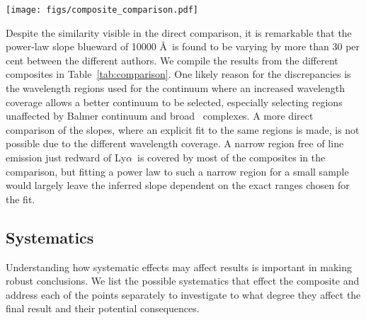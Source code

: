 \documentclass{aa}    %
\newcommand{\figlabel}[1]{\label{fig:#1}}
\newcommand{\Tab}[1]{Table~\ref{tab:#1}}
\newcommand{\tab}[1]{\Tab{#1}}
\newcommand{\sectlabel}[1]{\label{sect:#1}}
\newcommand{\lya}{Ly$\alpha$}
\newcommand{\feii}{\ion{Fe}{ii}}
\begin{document}
 \begin{figure*}[t!]
   \centering
   \texttt{[image: figs/composite\_comparison.pdf]}
   \caption[]{Comparison of different composites. The composites by
     \citet{Lusso2015, VandenBerk2001, Telfer2002, Francis1991} are
     normalized to the X-shooter composite at $\sim 1450$ \AA~and the
     composite by \citet{Glikman2006} is normalized to ours at $\sim
     3850$ \AA. Significant differences are visible blueward of
     \lya~due to differing IGM correction methods. Above 5000 \AA~
     significant host galaxy contamination is visible in the composite
     by \citet{VandenBerk2001}. Overplot in blue is a power law
     with slope $\alpha_\lambda = -1.70$ and normalized at $\sim 1450$ \AA.}
   \figlabel{composite_comparison}
 \end{figure*}
  
 
Despite the similarity visible in the direct comparison, it is
remarkable that the power-law slope blueward of 10000 \AA~is found to
be varying by more than 30 per cent between the different authors. We
compile the results from the different composites in
\tab{comparison}. One likely reason for the discrepancies is the
wavelength regions used for the continuum where an increased
wavelength coverage allows a better continuum to be selected,
especially selecting regions unaffected by Balmer continuum and broad
\feii~complexes. A more direct comparison of the slopes, where an
explicit fit to the same regions is made, is not possible due to the
different wavelength coverage. A narrow region free of line emission just redward of \lya~is covered by most of the composites in the comparison, but fitting a power law to such a narrow region for a small sample would largely leave the inferred slope dependent on the exact ranges chosen for the fit.





\subsection{Systematics}  \sectlabel{systematics}

Understanding how systematic effects may affect results is important in making
robust conclusions.
 We list the possible systematics that effect the composite and address each of
the points separately to investigate to what degree they affect the final result
and their potential consequences.
\end{document}
